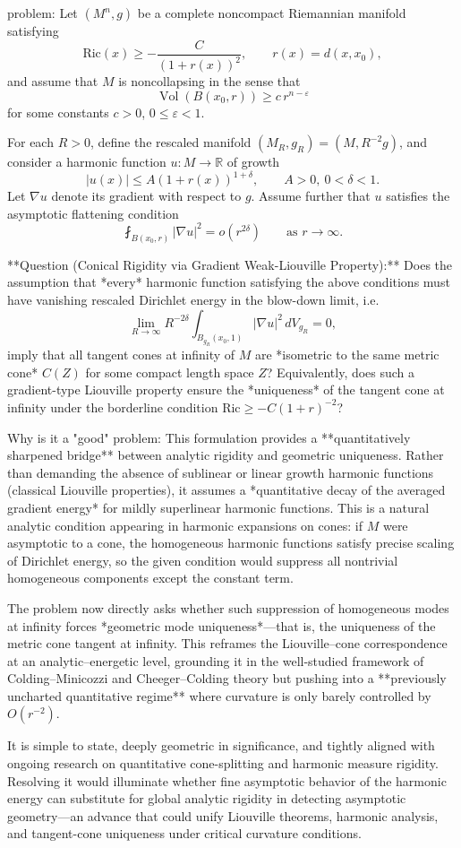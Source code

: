 problem:  
Let \( (M^n, g) \) be a complete noncompact Riemannian manifold satisfying  
\[
\mathrm{Ric}(x) \ge -\frac{C}{(1+r(x))^2}, \qquad r(x) = d(x, x_0),
\]
and assume that \(M\) is noncollapsing in the sense that  
\[
\operatorname{Vol}(B(x_0, r)) \ge c\, r^{n-\varepsilon}
\]
for some constants \(c>0\), \(0\le \varepsilon <1\).  

For each \(R>0\), define the rescaled manifold \( (M_R, g_R) = (M, R^{-2}g) \), and consider a harmonic function \(u\colon M \to \mathbb{R}\) of growth  
\[
|u(x)| \le A (1+r(x))^{1+\delta}, \qquad A>0,\ 0<\delta<1.
\]
Let \(\nabla u\) denote its gradient with respect to \(g\). Assume further that \(u\) satisfies the asymptotic flattening condition  
\[
\fint_{B(x_0,r)} |\nabla u|^2 = o(r^{2\delta}) \qquad \text{as } r\to\infty.
\]

**Question (Conical Rigidity via Gradient Weak-Liouville Property):**  
Does the assumption that *every* harmonic function satisfying the above conditions must have vanishing rescaled Dirichlet energy in the blow-down limit, i.e.  
\[
\lim_{R\to\infty} R^{-2\delta}\int_{B_{g_R}(x_0,1)} |\nabla u|^2\, dV_{g_R} = 0,
\]
imply that all tangent cones at infinity of \(M\) are *isometric to the same metric cone* \(C(Z)\) for some compact length space \(Z\)?  
Equivalently, does such a gradient-type Liouville property ensure the *uniqueness* of the tangent cone at infinity under the borderline condition \(\mathrm{Ric} \ge -C(1+r)^{-2}\)?  

Why is it a "good" problem:  
This formulation provides a **quantitatively sharpened bridge** between analytic rigidity and geometric uniqueness. Rather than demanding the absence of sublinear or linear growth harmonic functions (classical Liouville properties), it assumes a *quantitative decay of the averaged gradient energy* for mildly superlinear harmonic functions. This is a natural analytic condition appearing in harmonic expansions on cones: if \(M\) were asymptotic to a cone, the homogeneous harmonic functions satisfy precise scaling of Dirichlet energy, so the given condition would suppress all nontrivial homogeneous components except the constant term.  

The problem now directly asks whether such suppression of homogeneous modes at infinity forces *geometric mode uniqueness*—that is, the uniqueness of the metric cone tangent at infinity. This reframes the Liouville–cone correspondence at an analytic–energetic level, grounding it in the well-studied framework of Colding–Minicozzi and Cheeger–Colding theory but pushing into a **previously uncharted quantitative regime** where curvature is only barely controlled by \(O(r^{-2})\).  

It is simple to state, deeply geometric in significance, and tightly aligned with ongoing research on quantitative cone-splitting and harmonic measure rigidity. Resolving it would illuminate whether fine asymptotic behavior of the harmonic energy can substitute for global analytic rigidity in detecting asymptotic geometry—an advance that could unify Liouville theorems, harmonic analysis, and tangent-cone uniqueness under critical curvature conditions.